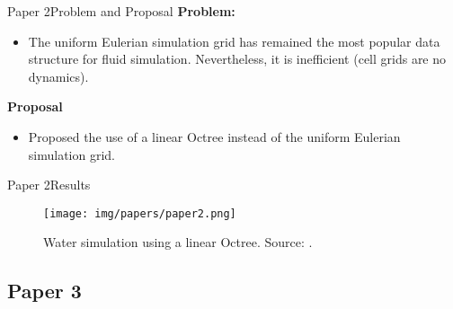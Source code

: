 \documentclass[10pt]{beamer}
\newcommand{\1}{
        	\setbeamertemplate{background}{
        		\texttt{[image: img/1]}
        		\tikz[overlay] \fill[fill opacity=0.75,fill=white] (0,0) rectangle (-\paperwidth,\paperheight);
        	}
}
\begin{document}
\begin{frame}{Paper 2}{Problem and Proposal}
	\textbf{Problem:}
	\begin{itemize}
		\item The uniform Eulerian simulation grid has remained the most
		popular data structure for fluid simulation. Nevertheless, it is inefficient (cell grids are no dynamics). 
	\end{itemize}

	\textbf{Proposal}
	\begin{itemize}
		\item Proposed the use of a linear Octree instead of the uniform Eulerian simulation grid.
	\end{itemize}	
	
\end{frame}


\begin{frame}{Paper 2}{Results}
	\begin{figure}
		\centering
		\texttt{[image: img/papers/paper2.png]}
		\caption{Water simulation using a linear Octree. Source: \cite{flynn2018adaptive}.}
	\end{figure}
\end{frame}



\subsection{Paper 3}
\end{document}
